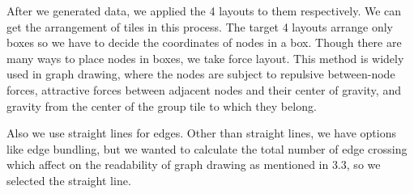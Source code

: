 \documentclass{llncs}
\begin{document}
%
%


After we generated data, we applied the 4 layouts to them respectively.
We can get the arrangement of tiles in this process.
The target 4 layouts arrange only boxes so we have to decide the coordinates of nodes in a box.
Though there are many ways to place nodes in boxes, we take force layout.
This method is widely used in graph drawing, where the nodes are subject to repulsive between-node forces, attractive forces between adjacent nodes and their center of gravity, and gravity from the center of the group tile to which they belong.

Also we use straight lines for edges.
Other than straight lines, we have options like edge bundling, but we wanted to calculate the total number of edge crossing which affect on the readability of graph drawing as mentioned in 3.3, so we selected the straight line.
\end{document}

